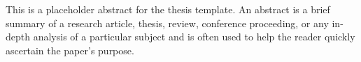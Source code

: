 This is a placeholder abstract for the thesis template. An abstract is a brief summary of a research article, thesis, review, conference proceeding, or any in-depth analysis of a particular subject and is often used to help the reader quickly ascertain the paper's purpose.